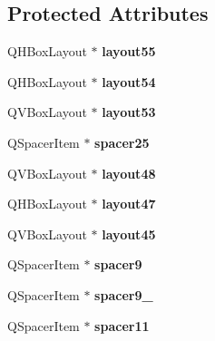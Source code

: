 \subsection*{Protected Attributes}
\begin{DoxyCompactItemize}
\item 
Q\+H\+Box\+Layout $\ast$ {\bfseries layout55}\hypertarget{classcalibrador_a70ca450e5a14a270b520bec666e78dfe}{}\label{classcalibrador_a70ca450e5a14a270b520bec666e78dfe}

\item 
Q\+H\+Box\+Layout $\ast$ {\bfseries layout54}\hypertarget{classcalibrador_a42fda58a953b70a21332b18644a06b6a}{}\label{classcalibrador_a42fda58a953b70a21332b18644a06b6a}

\item 
Q\+V\+Box\+Layout $\ast$ {\bfseries layout53}\hypertarget{classcalibrador_aea5a67fc067927f0d26ab6251981a7fb}{}\label{classcalibrador_aea5a67fc067927f0d26ab6251981a7fb}

\item 
Q\+Spacer\+Item $\ast$ {\bfseries spacer25}\hypertarget{classcalibrador_aaf782a7c24d2d2a7b65e816c23550ee1}{}\label{classcalibrador_aaf782a7c24d2d2a7b65e816c23550ee1}

\item 
Q\+V\+Box\+Layout $\ast$ {\bfseries layout48}\hypertarget{classcalibrador_ae43e92261985f290a867cf3b12805a7b}{}\label{classcalibrador_ae43e92261985f290a867cf3b12805a7b}

\item 
Q\+H\+Box\+Layout $\ast$ {\bfseries layout47}\hypertarget{classcalibrador_a186222241648285afa6af50f3337e8c8}{}\label{classcalibrador_a186222241648285afa6af50f3337e8c8}

\item 
Q\+V\+Box\+Layout $\ast$ {\bfseries layout45}\hypertarget{classcalibrador_af7feaba0d3e17539f2b1a7b2dcebb2cf}{}\label{classcalibrador_af7feaba0d3e17539f2b1a7b2dcebb2cf}

\item 
Q\+Spacer\+Item $\ast$ {\bfseries spacer9}\hypertarget{classcalibrador_aa85815d1eddc047e4bd687d2d8009854}{}\label{classcalibrador_aa85815d1eddc047e4bd687d2d8009854}

\item 
Q\+Spacer\+Item $\ast$ {\bfseries spacer9\+\_}\hypertarget{classcalibrador_aeeef3c1e8a8e86eacafb27103db65f36}{}\label{classcalibrador_aeeef3c1e8a8e86eacafb27103db65f36}

\item 
Q\+Spacer\+Item $\ast$ {\bfseries spacer11}\hypertarget{classcalibrador_a62904140a17858d62f5e212849787459}{}\label{classcalibrador_a62904140a17858d62f5e212849787459}


\end{DoxyCompactItemize}
